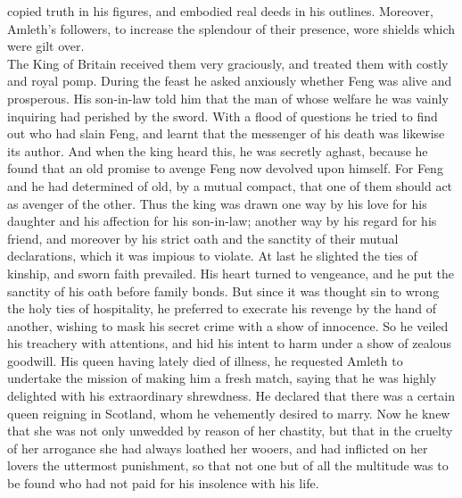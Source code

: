 \documentclass[10pt,a4paper]{report}
\begin{document}
copied truth in his figures, and embodied real deeds in his outlines. Moreover, Amleth's followers, to increase the splendour of their presence, wore shields which were gilt over.\\

The King of Britain received them very graciously, and treated them with costly and royal pomp. During the feast he asked anxiously whether Feng was alive and prosperous. His son-in-law told him that the man of whose welfare he was vainly inquiring had perished by the sword. With a flood of questions he tried to find out who had slain Feng, and learnt that the messenger of his death was likewise its author. And when the king heard this, he was secretly aghast, because he found that an old promise to avenge Feng now devolved upon himself. For Feng and he had determined of old, by a mutual compact, that one of them should act as avenger of the other. Thus the king was drawn one way by his love for his daughter and his affection for his son-in-law; another way by his regard for his friend, and moreover by his strict oath and the sanctity of their mutual declarations, which it was impious to violate. At last he slighted the ties of kinship, and sworn faith prevailed. His heart turned to vengeance, and he put the sanctity of his oath before family bonds. But since it was thought sin to wrong the holy ties of hospitality, he preferred to execrate his revenge by the hand of another, wishing to mask his secret crime with a show of innocence. So he veiled his treachery with attentions, and hid his intent to harm under a show of zealous goodwill. His queen having lately died of illness, he requested Amleth to undertake the mission of making him a fresh match, saying that he was highly delighted with his extraordinary shrewdness. He declared that there was a certain queen reigning in Scotland, whom he vehemently desired to marry. Now he knew that she was not only unwedded by reason of her chastity, but that in the cruelty of her arrogance she had always loathed her wooers, and had inflicted on her lovers the uttermost punishment, so that not one but of all the multitude was to be found who had not paid for his insolence with his life.\\
\end{document}
